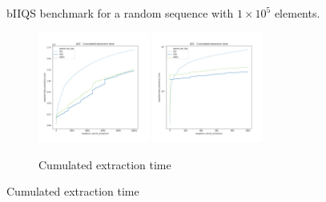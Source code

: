 \begin{figure}
    \caption{bIIQS benchmark for a random sequence with $1\times10^5$ elements.}
       \label{FIG:WORKHORSE_BENCHMARK_01}
\end{figure}


\begin{figure}

    \centering
    \begin{subfigure}[b]{\textwidth}
        \centering
        \includegraphics[width=0.40\textwidth]{./fragments/05_workhorse_experiment/images/01_basebenchmark_02_sort_a_case.png.0_0.png}
        \includegraphics[width=0.40\textwidth]{./fragments/05_workhorse_experiment/images/01_basebenchmark_02_sort_a_case.png.0_1.png}
        \caption{Cumulated extraction time}
        \label{FIG:WORKHORSE_BENCHMARK_02__0_0}
    \end{subfigure}


\end{figure}
